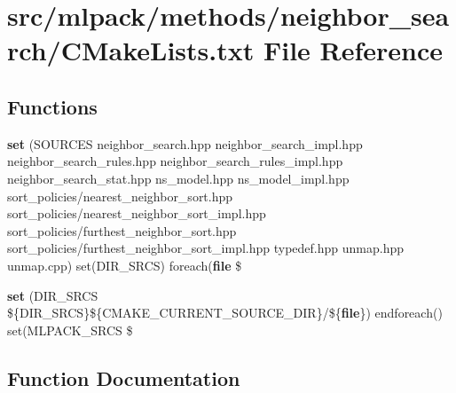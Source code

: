 \section{src/mlpack/methods/neighbor\+\_\+search/\+C\+Make\+Lists.txt File Reference}
\label{methods_2neighbor__search_2CMakeLists_8txt}
\subsection*{Functions}
\begin{DoxyCompactItemize}
\item 
{\bf set} (S\+O\+U\+R\+C\+ES neighbor\+\_\+search.\+hpp neighbor\+\_\+search\+\_\+impl.\+hpp neighbor\+\_\+search\+\_\+rules.\+hpp neighbor\+\_\+search\+\_\+rules\+\_\+impl.\+hpp neighbor\+\_\+search\+\_\+stat.\+hpp ns\+\_\+model.\+hpp ns\+\_\+model\+\_\+impl.\+hpp sort\+\_\+policies/nearest\+\_\+neighbor\+\_\+sort.\+hpp sort\+\_\+policies/nearest\+\_\+neighbor\+\_\+sort\+\_\+impl.\+hpp sort\+\_\+policies/furthest\+\_\+neighbor\+\_\+sort.\+hpp sort\+\_\+policies/furthest\+\_\+neighbor\+\_\+sort\+\_\+impl.\+hpp typedef.\+hpp unmap.\+hpp unmap.\+cpp) set(D\+I\+R\+\_\+\+S\+R\+CS) foreach({\bf file} \$
\item 
{\bf set} (D\+I\+R\+\_\+\+S\+R\+CS \$\{D\+I\+R\+\_\+\+S\+R\+CS\}\$\{C\+M\+A\+K\+E\+\_\+\+C\+U\+R\+R\+E\+N\+T\+\_\+\+S\+O\+U\+R\+C\+E\+\_\+\+D\+IR\}/\$\{{\bf file}\}) endforeach() set(M\+L\+P\+A\+C\+K\+\_\+\+S\+R\+CS \$
\end{DoxyCompactItemize}


\subsection{Function Documentation}
